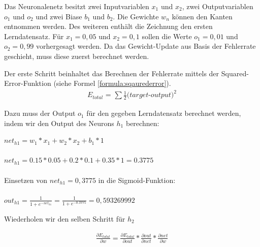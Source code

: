 Das Neuronalenetz besitzt zwei Inputvariablen $x_{1}$ und $x_{2}$, zwei Outputvariablen  $o_{1}$ und $o_{2}$ und zwei Biase $b_{1}$ und $b_{2}$. Die Gewichte $w_{n}$ können den Kanten entnommen werden. Des weiteren enthält die Zeichnung den ersten Lerndatensatz. Für $x_{1} = 0,05$ und $x_{2} = 0,1$ sollen die Werte $o_{1} = 0,01$ und $o_{2} = 0,99$ vorhergesagt werden. Da das Gewicht-Update aus Basis der Fehlerrate geschieht, muss diese zuerst berechnet werden.

\begin{enumerate*}
\item Der erste Schritt beinhaltet das Berechnen der Fehlerrate mittels der Squared-Error-Funktion (siehe Formel \ref{formula:sqaurederror}). 
\begin{align}
\label{formula:sqaurederror}
E_{total} \text{ = } \sum\frac{1}{2}\textit{(target-output)}^2 
\end{align}

Dazu muss der Output $o_{1}$ für den gegeben Lerndatensatz berechnet werden, indem wir den Output des Neurons $h_{1}$ berechnen: 


$net_{h1} = w_{1} *  x_{1} + w_{2} * x_{2} + b_{1} * 1$
\\ \\
$net_{h1} = 0.15 *  0.05 + 0.2 * 0.1 + 0.35 * 1 = 0.3775$
\\ \\
Einsetzen von $net_{h1} = 0,3775$ in die Sigmoid-Funktion:
\\ \\
$out_{h1} = \frac{1}{1 + e^{-net_{h1}}} = \frac{1}{1 + e^{-0.3775}} = 0,593269992$ 

Wiederholen wir den selben Schritt für $h_{2}$ 


\item 
\begin{align}
\label{formula:chainrule}
\frac{\partial E_{total}}{\partial w} = \frac{\partial E_{total}}{\partial out} * \frac{\partial out}{\partial net} * \frac{\partial net}{\partial w}
\end{align}
\end{enumerate*} 